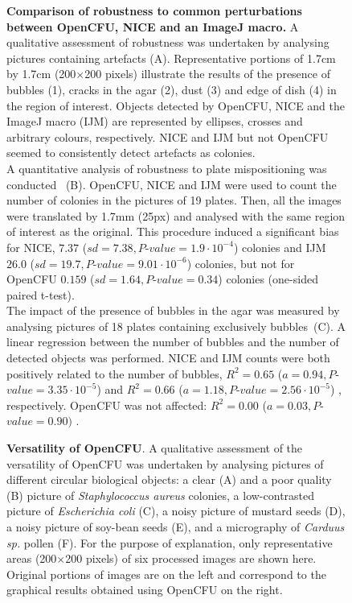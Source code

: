 \documentclass[10pt]{article}
\newcommand{\sa}{\emph{Staphylococcus aureus}}
\newcommand{\IJM}{IJM}
\newcommand{\EdgeNoiseOCFU}{$0.159$ ($sd=1.64, P$-$value=0.34$)}
\newcommand{\EdgeNoiseIJM}{$26.0$ ($sd=19.7, P$-$value=9.01\cdot 10^{-6}$)}
\newcommand{\EdgeNoiseNICE}{$7.37$ ($sd=7.38,P$-$value=1.9\cdot 10^{-4}$)}
\newcommand{\BubbleNoiseOCFU}{$R^2 = 0.00$ ($a=0.03, P$-$value=0.90)$ }
\newcommand{\BubbleNoiseNICE}{$R^2 = 0.65$ ($a=0.94, P$-$value=3.35\cdot 10^{-5}$) }
\newcommand{\BubbleNoiseIJM}{$R^2 = 0.66$ ($a=1.18, P$-$value=2.56\cdot 10^{-5}$) }
\begin{document}
\begin{figure}[!ht]
\begin{center}
\end{center}

\caption{{\bf Comparison of robustness to common perturbations between OpenCFU, 
NICE\cite{clarke_lowcost_2010} and an ImageJ macro\cite{cai_optimized_2011}.} 
A qualitative assessment of robustness was undertaken by analysing pictures
containing artefacts (A).
Representative portions of 1.7cm by 1.7cm (200$\times{}$200 pixels) illustrate
the results of the presence of bubbles (1), cracks in the agar (2), dust (3) and
edge of dish (4) in the region of interest. Objects detected by OpenCFU, NICE
and the ImageJ macro (\IJM) are represented by ellipses, crosses and arbitrary
colours, respectively.
NICE and \IJM{} but not OpenCFU seemed to consistently detect artefacts as
colonies.\\
A quantitative analysis of robustness to plate mispositioning was
conducted ~(B).
OpenCFU, NICE and \IJM{} were used to count the number of colonies in the
pictures of 19 plates. Then, all the images were translated by 1.7mm (25px) and
analysed with the same region of interest as the original.
This procedure induced a significant bias for NICE, \EdgeNoiseNICE{} colonies and \IJM{}
\EdgeNoiseIJM{} colonies, but not for OpenCFU \EdgeNoiseOCFU{} colonies (one-sided paired
t-test).\\
The impact of the presence of bubbles in the agar was measured by analysing
pictures of 18 plates containing exclusively bubbles~(C).
A linear regression between the number of bubbles and the number of detected
objects was performed.
NICE and \IJM{} counts were both positively related to the number of bubbles,
\BubbleNoiseNICE{} and \BubbleNoiseIJM{}, respectively. OpenCFU was not affected:
\BubbleNoiseOCFU{}	.
}
\label{figRobust}
\end{figure}

\newpage{}


\begin{figure}[!ht]

\begin{center}
\end{center}

\caption{{\bf Versatility of OpenCFU}.
A qualitative assessment of the versatility of OpenCFU was undertaken by 
analysing pictures of different circular biological objects:
a clear (A) and a poor quality (B) picture of \sa{} colonies,
a low-contrasted picture of \emph{Escherichia coli} (C),
a noisy picture of mustard seeds (D),
a noisy picture of soy-bean seeds (E),
and a micrography of \emph{Carduus sp.} pollen (F).
For the purpose of explanation, only representative areas (200$\times{}$200 pixels)
of six processed images are shown here.
Original portions of images are on the left and correspond to 
the graphical results obtained using OpenCFU on the right.
}
\label{figVersat}
\end{figure}
\end{document}
